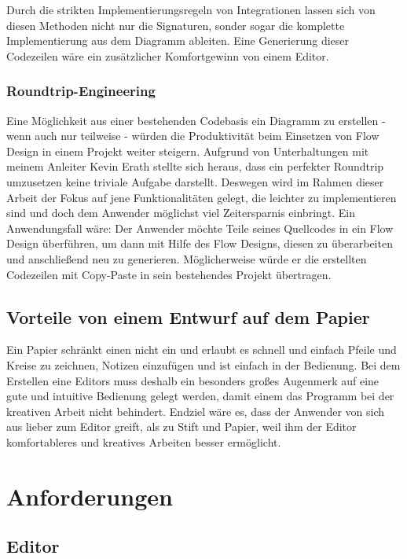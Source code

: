 Durch die strikten Implementierungsregeln von Integrationen lassen sich von
diesen Methoden nicht nur die Signaturen, sonder sogar die komplette Implementierung aus dem Diagramm
ableiten. Eine Generierung dieser Codezeilen wäre ein zusätzlicher Komfortgewinn von einem Editor.
\subsubsection{Roundtrip-Engineering}

Eine Möglichkeit aus einer bestehenden Codebasis ein Diagramm zu erstellen -
wenn auch nur teilweise - würden die Produktivität beim Einsetzen von Flow
Design in einem Projekt weiter steigern. Aufgrund von Unterhaltungen mit meinem
Anleiter Kevin Erath stellte sich heraus, dass ein perfekter Roundtrip umzusetzen keine triviale Aufgabe
darstellt. Deswegen wird im Rahmen dieser Arbeit der Fokus auf jene Funktionalitäten
gelegt, die leichter zu implementieren sind und doch dem Anwender möglichst viel
Zeitersparnis einbringt. Ein Anwendungsfall wäre: Der Anwender möchte
Teile seines Quellcodes in ein Flow Design überführen, um dann mit Hilfe des
Flow Designs, diesen zu überarbeiten und anschließend neu zu generieren.
Möglicherweise würde er die erstellten Codezeilen mit Copy-Paste in sein
bestehendes Projekt übertragen.

\subsection{Vorteile von einem Entwurf auf dem Papier}

Ein Papier schränkt einen nicht ein und erlaubt es schnell und einfach Pfeile
und Kreise zu zeichnen, Notizen einzufügen und ist einfach in der Bedienung.
Bei dem Erstellen eine Editors muss deshalb ein besonders großes Augenmerk auf
eine gute und intuitive Bedienung gelegt werden, damit einem das Programm bei der kreativen Arbeit nicht
behindert. Endziel wäre es, dass der Anwender von sich aus lieber zum Editor
greift, als zu Stift und Papier, weil ihm der Editor komfortableres und
kreatives Arbeiten besser ermöglicht.

\section{Anforderungen}

\subsection{Editor}

